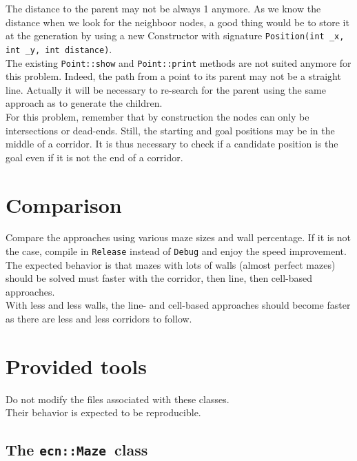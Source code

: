\documentclass{ecnreport}
\def\maze{\texttt{ecn::Maze}~}
\begin{document}
The distance to the parent may not be always 1 anymore. As we know the distance when we look for the neighboor nodes, a good thing would be to store it 
at the generation by using a new Constructor with signature \texttt{Position(int \_x, int \_y, int distance)}. \\

The existing \texttt{Point::show} and \texttt{Point::print} methods are not suited anymore for this problem. Indeed, the path from a point to its parent 
may not be a straight line. Actually it will be necessary to re-search for the parent using the same approach as to generate the children.\\

For this problem, remember that by construction the nodes can only be intersections or dead-ends. Still, the starting and goal positions may 
be in the middle of a corridor. It is thus necessary to check if a candidate position is the goal even if it is not the end of a corridor.

\section{Comparison}

Compare the approaches using various maze sizes and wall percentage.
If it is not the case, compile in \texttt{Release} instead of \texttt{Debug} and enjoy the speed improvement.\\

The expected behavior is that mazes with lots of walls (almost perfect mazes) should be solved must faster with the corridor, then line, then cell-based approaches.\\
With less and less walls, the line- and cell-based approaches should become faster as there are less and less corridors to follow.

\appendix

\section{Provided tools}

Do not modify the files associated with these classes.\\Their behavior is expected to be reproducible.

\subsection{The \maze class}\label{mazeClass}
\end{document}
